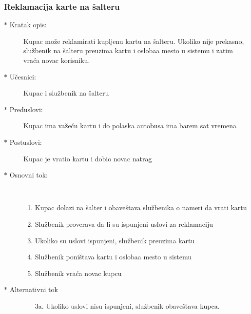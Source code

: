 \subsubsection{Reklamacija karte na \v salteru}
\begin{description}
  \item[$\ast$ Kratak opis: ] Kupac mo\v ze reklamirati kupljenu kartu na \v salteru. Ukoliko nije prekasno, slu\v zbenik na \v salteru preuzima kartu i osloba\dj{}a mesto u sistemu i zatim vra\'ca novac korisniku.
  \item[$\ast$ U\v cesnici: ] Kupac i slu\v zbenik na \v salteru
  \item[$\ast$ Preduslovi: ] Kupac ima va\v ze\'cu kartu i do polaska autobusa ima barem sat vremena
  \item[$\ast$ Postuslovi: ] Kupac je vratio kartu i dobio novac natrag
  \item[$\ast$ Osnovni tok: ] \ \\
  \begin{enumerate}
    \item Kupac dolazi na \v salter i obave\v stava slu\v zbenika o nameri da vrati kartu
    \item Slu\v zbenik proverava da li su ispunjeni uslovi za reklamaciju
    \item Ukoliko su uslovi ispunjeni, slu\v zbenik preuzima kartu
    \item Slu\v zbenik poni\v stava kartu i osloba\dj{}a mesto u sistemu
    \item Slu\v zbenik vra\'ca novac kupcu
  \end{enumerate}
  \item[$\ast$ Alternativni tok]
  \begin{enumerate}
    \item[3a. ]  Ukoliko uslovi nisu ispunjeni, slu\v zbenik obave\v stava kupca.
  \end{enumerate}

\end{description}

